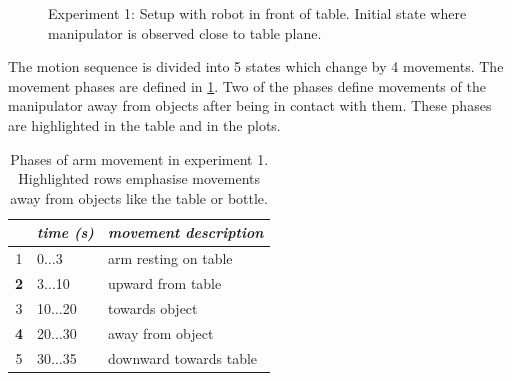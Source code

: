 \begin{figure}[h]
\centering
{}
\hspace{1cm}
\caption[Exp. 1: Setup]{Experiment 1: Setup with robot in front of table. Initial state where manipulator is observed close to table plane.}
\label{fig:exp1_setup}
\end{figure}

The motion sequence is divided into 5 states which change by 4 movements. The movement phases are defined in \cref{tab:prior_movement_phases}. Two of the phases define movements of the manipulator away from objects after being in contact with them. These phases are highlighted in the table and in the plots.

\begin{table}[h]
\centering
\begin{tabular}{|c|l|l|}
\hline
 & \emph{time (s)} & \emph{movement description} \\
\hline
1 & 0$\dots$3 & arm resting on table \\
\hline
\rowcolor{gray!30} \textbf{2} & 3$\dots$10 & upward from table \\
\hline
3 & 10$\dots$20 & towards object \\
\hline
\rowcolor{gray!30} \textbf{4} & 20$\dots$30 & away from object \\
\hline
5 & 30$\dots$35 & downward towards table \\
\hline
\end{tabular}
\caption{Phases of arm movement in experiment 1. Highlighted rows emphasise movements away from objects like the table or bottle.}
\label{tab:prior_movement_phases}
\end{table}

